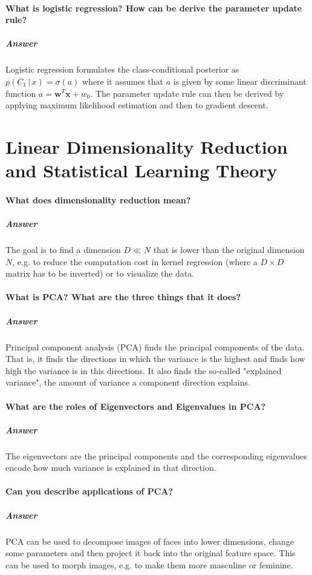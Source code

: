 \documentclass[a4paper, 11pt, accentcolor = tud3b]{tudreport}
\newcommand{\answer}[1]{\subparagraph{Answer} #1}
\newcommand{\given}{\ensuremath{\,\vert\,}}
\renewcommand{\vec}[1]{\mathbf{#1}}
\begin{document}
			\paragraph{What is logistic regression? How can be derive the parameter update rule?}
			\answer{Logistic regression formulates the class-conditional posterior as \( p(C_1 \given x) = \sigma(a) \) where it assumes that \(a\) is given by some linear discriminant function \( a = \vec{w}^T \vec{x} + w_0 \). The parameter update rule can then be derived by applying maximum likelihood estimation and then to gradient descent.}

		\section{Linear Dimensionality Reduction and Statistical Learning Theory}
			\paragraph{What does dimensionality reduction mean?}
			\answer{The goal is to find a dimension \( D \ll N \) that is lower than the original dimension \(N\), e.g. to reduce the computation cost in kernel regression (where a \( D \times D \) matrix has to be inverted) or to visualize the data.}

			\paragraph{What is PCA? What are the three things that it does?} %
			\answer{Principal component analysis (PCA) finds the principal components of the data. That is, it finds the directions in which the variance is the highest and finds how high the variance is in this directions. It also finds the so-called "explained variance", the amount of variance a component direction explains.}

			\paragraph{What are the roles of Eigenvectors and Eigenvalues in PCA?}
			\answer{The eigenvectors are the principal components and the corresponding eigenvalues encode how much variance is explained in that direction.}

			\paragraph{Can you describe applications of PCA?}
			\answer{PCA can be used to decompose images of faces into lower dimensions, change some parameters and then project it back into the original feature space. This can be used to morph images, e.g. to make them more masculine or feminine.}
\end{document}

